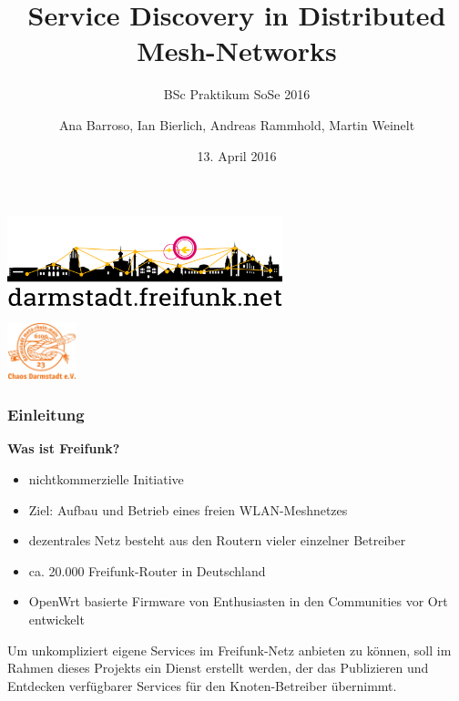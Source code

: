 \documentclass[accentcolor=tud6b,colorbacktitle,inverttitle,landscape,german,presentation,t]{tudbeamer}
\begin{document}
	
	\title[Service Discovery in Distributed Mesh-Networks]{Service Discovery in Distributed Mesh-Networks}
	\subtitle{BSc Praktikum SoSe 2016}
	
	\author{Ana Barroso, Ian Bierlich, Andreas Rammhold, Martin Weinelt}


	\date{13. April 2016}
	
	\begin{titleframe}
		\begin{center}
			\vspace{1cm}
			\includegraphics[width=0.6\textwidth]{images/logo-skyline-text-below}
			\vspace{1.4cm}
		\end{center}
			\flushright
			\includegraphics[width=0.15\textwidth]{images/cda}
	\end{titleframe}
	
	\begin{frame}
		\frametitle{Einleitung}
		\vfill
		\textbf{Was ist Freifunk?}
		\vfill
		\begin{itemize}
			\item nichtkommerzielle Initiative
			\item Ziel: Aufbau und Betrieb eines freien WLAN-Meshnetzes
			\item dezentrales Netz besteht aus den Routern vieler einzelner Betreiber
			\item ca. 20.000 Freifunk-Router in Deutschland
			\item OpenWrt basierte Firmware von Enthusiasten in den Communities vor Ort entwickelt
		\end{itemize}
		\vfill
		\pause
		Um unkompliziert eigene Services im Freifunk-Netz anbieten zu können, soll im Rahmen dieses Projekts ein Dienst erstellt werden, der das Publizieren und Entdecken verfügbarer Services für den Knoten-Betreiber übernimmt.		
	\end{frame}
\end{document}
